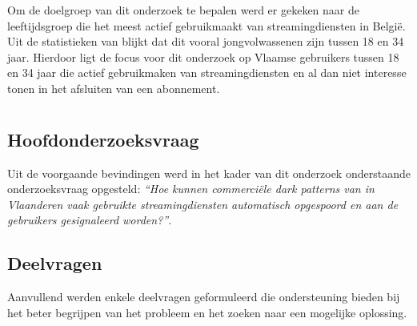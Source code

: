 \vspace{1em}

Om de doelgroep van dit onderzoek te bepalen werd er gekeken naar de leeftijdsgroep die het meest actief gebruikmaakt van streamingdiensten in België. Uit de statistieken van \textcite{StatistiekVlaanderen2025} blijkt dat dit vooral jongvolwassenen zijn tussen 18 en 34 jaar. Hierdoor ligt de focus voor dit onderzoek op Vlaamse gebruikers tussen 18 en 34 jaar die actief gebruikmaken van streamingdiensten en al dan niet interesse tonen in het afsluiten van een abonnement.

\vspace{1em}

\section{}%
\label{sec:onderzoeksvraag}

\subsection{Hoofdonderzoeksvraag}
\label{subsec:hoofdonderzoeksvraag}

\vspace{1em}

Uit de voorgaande bevindingen werd in het kader van dit onderzoek onderstaande onderzoeksvraag opgesteld: \emph{“Hoe kunnen commerciële dark patterns van in Vlaanderen vaak gebruikte streamingdiensten automatisch opgespoord en aan de gebruikers gesignaleerd worden?”}.

\vspace{1em}

\subsection{Deelvragen}
\label{subsec:deelvragen}

\vspace{1em}

Aanvullend werden enkele deelvragen geformuleerd die ondersteuning bieden bij het beter begrijpen van het probleem en het zoeken naar een mogelijke oplossing.

